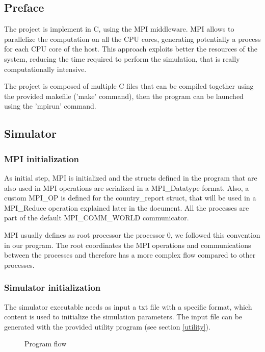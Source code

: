 \documentclass[10pt]{article}
\begin{document}
	\subsection{Preface}
	The project is implement in C, using the MPI middleware. MPI allows to parallelize the computation on all the CPU cores, generating potentially a process for each CPU core of the host. This approach exploits better the resources of the system, reducing the time required to perform the simulation, that is really computationally intensive.
	
	The project is composed of multiple C files that can be compiled together using the provided makefile ('make' command), then the program can be launched using the 'mpirun' command.
	
	\subsection{Simulator}
	\subsubsection{MPI initialization}
	As initial step, MPI is initialized and the structs defined in the program that are also used in MPI operations are serialized in a MPI\_Datatype format. Also, a custom MPI\_OP is defined for the country\_report struct, that will be used in a MPI\_Reduce operation explained later in the document. All the processes are part of the default MPI\_COMM\_WORLD communicator. 
	
	MPI usually defines as root processor the processor 0, we followed this convention in our program. The root coordinates the MPI operations and communications between the processes and therefore has a more complex flow compared to other processes.
	
	\subsubsection{Simulator initialization}
	The simulator executable needs as input a txt file with a specific format, which content is used to initialize the simulation parameters. The input file can be generated with the provided utility program (see section \ref{utility}).
	
	\begin{figure}[H]
		\centering
		\caption[]{Program flow}
		\label{fig:p4flow}
	\end{figure}
	
\end{document}
